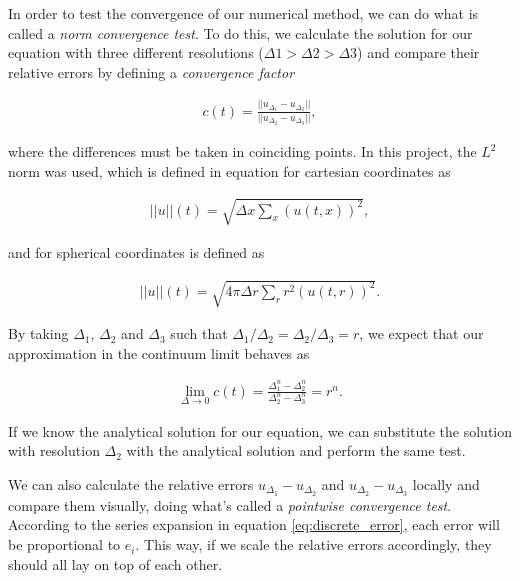 In order to test the convergence of our numerical method, we can do what is called a \textit{norm convergence test}. To do this, we calculate the solution for our equation with three different resolutions ($\Delta1 >\Delta2 > \Delta3$) and compare their relative errors by defining a \textit{convergence factor} 

\begin{align}
    c(t) = \frac{||u_{\Delta_1} - u_{\Delta_2}||}{||u_{\Delta_2} - u_{\Delta_3}||},
    \label{eq:norm_convergence}
\end{align}

\noindent
where the differences must be taken in coinciding points. In this project, the $L^2$ norm was used, which is defined in equation for cartesian coordinates as 

\begin{align}
    ||u||(t) = \sqrt{\Delta x \sum_{x} (u(t,x))^2},
    \label{eq:norm_cartesian}
\end{align}

\noindent
and for spherical coordinates is defined as

\begin{align}
    ||u||(t) = \sqrt{4 \pi \Delta r \sum_{r} r^2(u(t,r))^2}.
    \label{eq:norm_spherical}
\end{align}

By taking $\Delta_1$, $\Delta_2$ and $\Delta_3$ such that $\Delta_1 / \Delta_2 = \Delta_2 / \Delta_3 = r$, we expect that our approximation in the continuum limit behaves as 

\begin{align}
    \lim_{\Delta \to 0} c(t) = \frac{\Delta_1^n - \Delta_2^n}{\Delta_2^n - \Delta_3^n} = r^n.
    \label{eq:norm_convergence_limit}
\end{align}

If we know the analytical solution for our equation, we can substitute the solution with resolution $\Delta_2$ with the analytical solution and perform the same test.

We can also calculate the relative errors $u_{\Delta_1} - u_{\Delta_2}$ and $u_{\Delta_2} - u_{\Delta_3}$ locally and compare them visually, doing what's called a \textit{pointwise convergence test}. According to the series expansion in equation \eqref{eq:discrete_error}, each error will be proportional to $e_i$. This way, if we scale the relative errors accordingly, they should all lay on top of each other.